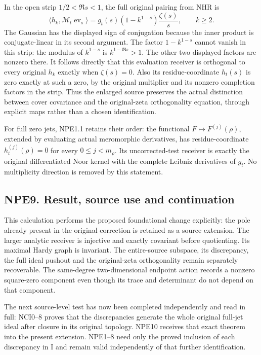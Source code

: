 In the open strip \(1/2<\Re s<1\), the full original pairing from NHR is
\[
\langle h_k,\mathcal M_t\operatorname{ev}_s\rangle
=g_t(s)(1-k^{1-s})\frac{\zeta(s)}s,\qquad k\ge2.
\tag{NPE8.2}
\] The Gaussian has the displayed sign of conjugation because the inner
product is conjugate-linear in its second argument. The factor
\(1-k^{1-s}\) cannot vanish in this strip: the modulus of \(k^{1-s}\) is
\(k^{1-\Re s}>1\). The other two displayed factors are nonzero there. It
follows directly that this evaluation receiver is orthogonal to every
original \(h_k\) exactly when \(\zeta(s)=0\). Also its
residue-coordinate \(h_t(s)\) is zero exactly at such a zero, by the
original multiplier and its nonzero completion factors in the strip.
Thus the enlarged source preserves the actual distinction between cover
covariance and the original-zeta orthogonality equation, through
explicit maps rather than a chosen identification.

For full zero jets, NPE1.1 retains their order: the functional
\(F\mapsto F^{(j)}(\rho)\), extended by evaluating actual meromorphic
derivatives, has residue-coordinate \(h_t^{(j)}(\rho)=0\) for every
\(0\le j<m_\rho\). Its uncorrected-test receiver is exactly the original
differentiated Noor kernel with the complete Leibniz derivatives of
\(g_t\). No multiplicity direction is removed by this statement.

\subsection{NPE9. Result, source use and
continuation}\label{npe9.-result-source-use-and-continuation}

This calculation performs the proposed foundational change explicitly:
the pole already present in the original correction is retained as a
source extension. The larger analytic receiver is injective and exactly
covariant before quotienting. Its maximal Hardy graph is invariant. The
entire-source subspace, its discrepancy, the full ideal pushout and the
original-zeta orthogonality remain separately recoverable. The
same-degree two-dimensional endpoint action records a nonzero
square-zero component even though its trace and determinant do not
depend on that component.

The next source-level test has now been completed independently and read
in full: NCI0--8 proves that the discrepancies generate the whole
original full-jet ideal after closure in its original topology. NPE10
receives that exact theorem into the present extension. NPE1--8 need
only the proved inclusion of each discrepancy in I and remain valid
independently of that further identification.

